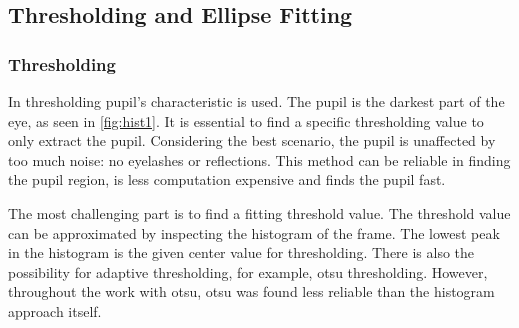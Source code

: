 \subsection{Thresholding and Ellipse Fitting}
\subsubsection{Thresholding}
In thresholding pupil's characteristic is used. The pupil is the darkest part of the eye, as seen in \ref{fig:hist1}. It is essential to find a specific thresholding value to only extract the pupil. Considering the best scenario, the pupil is unaffected by too much noise: no eyelashes or reflections. This method can be reliable in finding the pupil region, is less computation expensive and finds the pupil fast. 

The most challenging part is to find a fitting threshold value. The threshold value can be approximated by inspecting the histogram of the frame. The lowest peak in the histogram is the given center value for thresholding. There is also the possibility for adaptive thresholding, for example, otsu thresholding. However, throughout the work with otsu, otsu was found less reliable than the histogram approach itself. 

